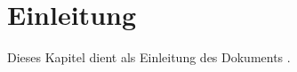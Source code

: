 \chapter*{Einleitung}
\label{ch:intro}
Dieses Kapitel dient als Einleitung des Dokuments \autocite{examplecitation}.
